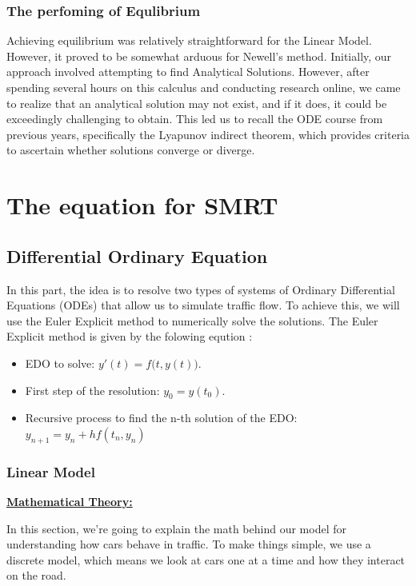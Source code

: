 \documentclass{article}
\begin{document}
	\subsubsection{The perfoming of Equlibrium}
		Achieving equilibrium was relatively straightforward for the Linear Model. However, it proved to be somewhat arduous for Newell's method. Initially, our approach involved attempting to find Analytical Solutions. However, after spending several hours on this calculus and conducting research online, we came to realize that an analytical solution may not exist, and if it does, it could be exceedingly challenging to obtain. This led us to recall the ODE course from previous years, specifically the Lyapunov indirect theorem, which provides criteria to ascertain whether solutions converge or diverge.
	\section{The equation for SMRT}
		\subsection{Differential Ordinary Equation }
		In this part, the idea is to resolve two types of systems of Ordinary Differential Equations (ODEs) that allow us to simulate traffic flow. To achieve this, we will use the Euler Explicit method to numerically solve the solutions.
		The Euler Explicit method is given by the folowing eqution :
		\begin{itemize} 
			\item EDO to solve: $\boxed{y'(t) = f{\bigl (}t, y(t){\bigr )}}$.
			\item First step of the resolution: $\boxed{y_0 = y(t_0)}$.
			\item Recursive process to find the n-th solution of the EDO: $\boxed{y_{n+1} = y_{n} + hf(t_{n}, y_{n})}$
		\end{itemize}
		
		
		
		
		
		\subsubsection{Linear Model}
			\textbf{\underline{Mathematical Theory:}}
			\newline
			
			In this section, we're going to explain the math behind our model for understanding how cars behave in traffic. To make things simple, we use a discrete model, which means we look at cars one at a time and how they interact on the road.
			
\end{document}
